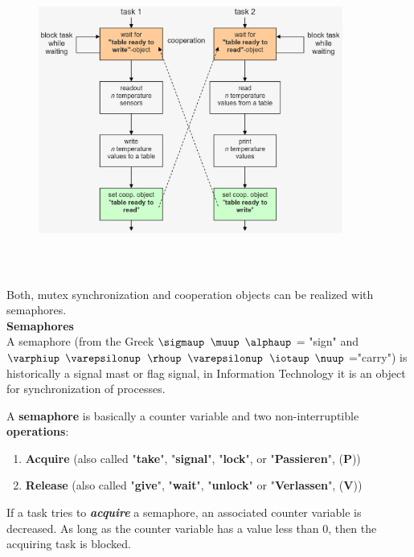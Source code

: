  	\begin{figure}[h]
    \centering
    \includegraphics[width=10cm, height=10cm]{Images/image104.png}
    \label{fig:Fig }
    \end{figure}
    
Both, mutex synchronization and cooperation objects can be realized with semaphores.\\

{\rot\bf Semaphores}\\

A semaphore (from the Greek $\sigmaup$ $\muup$ $\alphaup$ = "sign" and $\varphiup$ $\varepsilonup$ $\rhoup$ $\varepsilonup$ $\iotaup$ $\nuup$ ="carry") is historically a signal mast or flag signal, in Information Technology it is an object for synchronization of processes.


A \textbf{semaphore} is basically a counter variable and two non-interruptible \textbf{operations}:  

\begin{enumerate}
\item  \textbf{Acquire}   (also called "\textbf{take}", "\textbf{signal}",  "\textbf{lock}",     or "\textbf{Passieren}", (\textbf{P}))
\item  \textbf{Release}  (also called "\textbf{give}", "\textbf{wait}",  "\textbf{unlock}"  or "\textbf{Verlassen}", (\textbf{V}))
\end{enumerate}

If a task tries to \textbf{\textit{acquire}} a semaphore, an associated counter variable is decreased. As long as the counter variable has a value less than 0, then the acquiring task is blocked.\\

